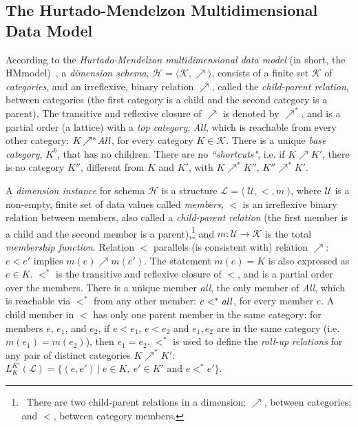 \documentclass[format=acmsmall, review=false, screen=true]{acmart}
\newcommand{\ignore}[1]{}
\newcommand{\mc}[1]{\mathcal{ #1}}
\newcommand{\mscr}[1]{\mathscr{ #1}}
\newcommand{\nit}[1]{{\it #1}}
\newcommand{\bl}[1]{#1}
\newcommand{\prg}{\Pi}
\newcommand{\hm}{HM}
\newcommand{\blue}[1]{{#1}}
\newcommand{\comlb}[1]{{\vspace{2mm}\noindent \bf \blue{COMM(LEO):}}~ #1 \hfill {\bf
    END.}\\}
\newcommand{\commos}[1]{{\vspace{2mm}\noindent \bf \blue{COMM(MOSTAFA):}}~ #1 \hfill {\bf
    END.}\\}
\begin{document}
\ignore{\vspace{-4mm}
\bl{\begin{align}
R(x,y) ~&\rightarrow~ \exists z\;S(z,x,y).\label{frm:sep4NEW}
\end{align}
The chase of $\prg'$ additionally applies (\ref{frm:sep4NEW}) and}

\comlb{Can the example be modified to produce also a  failing chase?}
\commos{The additional part highlighted in blue makes for chase failure.}
}




\subsection{The Hurtado-Mendelzon Multidimensional Data Model} \label{sec:hm}

According to the {\em Hurtado-Mendelzon  multidimensional data model} (in short, the \hm model)~\cite{hurtado-pods}, a \nit{dimension schema}, $\mscr{H}=\langle \mscr{K},\nearrow \rangle$, consists of a finite set $\mscr{K}$ of {\em categories}, and an irreflexive, binary relation $\nearrow$, called the {\em child-parent relation}, between categories (the first category is a child and the second category is a parent).  The transitive and reflexive closure of $\nearrow$ is denoted by $\nearrow^{*}$, and is a partial order (a lattice) with a {\em top category}, {\em All}, which is reachable from every other category: $K\!\nearrow^*\!\nit{All}$, for every category $K \in \mscr{K}$. There is a unique {\em base category}, $K^b$, that has no children. There are no {\em ``shortcuts"}, i.e. if $K \nearrow K'$, there is no category $K''$, different from $K$ and $K'$, with $K \nearrow^* K''$, $K'' \nearrow^* K'$.

A {\em dimension instance} for schema $\mscr{H}$ is a structure $\mscr{L}=\langle\;\!\mc{U},<,m\;\!\rangle$, where $\mc{U}$ is a non-empty, finite set of data values called {\em members}, $<$ is an irreflexive binary relation between members, also called a {\em child-parent relation} (the first member is a child and the second member is a parent),\footnote{\ There are two child-parent relations in a dimension: $\nearrow$, between categories; and $<$, between category members.} and $m\!: \mc{U} \rightarrow \mscr{K}$ is the total {\em membership function}. Relation $<$ parallels (is consistent with) relation $\nearrow$: $e < e'$ implies $m(e) \nearrow m(e')$. The statement $m(e)=K$ is also expressed as $e \in K$. $<^{*}$ is the transitive and reflexive closure of $<$, and is a partial order over the members. There is a unique member \nit{all}, the only member of \nit{All}, which is reachable via $<^*$ from any other member: $e <^{*} \nit{all}$, for every member $e$. A child member in $<$ has only one parent member in the same category: for members $e$, $e_1$, and $e_2$, if $e < e_1$, $e < e_2$ and $e_1,e_2$ are in the same category (i.e. $m(e_1)=m(e_2)$), then $e_1=e_2$. $<^{*}$ is used to define the {\em roll-up} {\em relations} for any pair of distinct categories  $K \nearrow^* K'$: \ $L_{K}^{K'}(\mscr{L})=\{(e,e')~|~e \in K, \ e' \in K' \mbox{ and } e <^* e'\}$.
\end{document}
